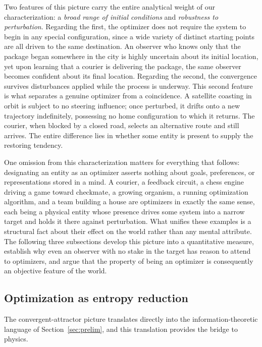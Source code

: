 \documentclass[11pt]{article}
\begin{document}
Two features of this picture carry the entire analytical weight of our characterization: a \emph{broad range of initial conditions} and \emph{robustness to perturbation}. Regarding the first, the optimizer does not require the system to begin in any special configuration, since a wide variety of distinct starting points are all driven to the same destination. An observer who knows only that the package began somewhere in the city is highly uncertain about its initial location, yet upon learning that a courier is delivering the package, the same observer becomes confident about its final location. Regarding the second, the convergence survives disturbances applied while the process is underway. This second feature is what separates a genuine optimizer from a coincidence. A satellite coasting in orbit is subject to no steering influence; once perturbed, it drifts onto a new trajectory indefinitely, possessing no home configuration to which it returns. The courier, when blocked by a closed road, selects an alternative route and still arrives. The entire difference lies in whether some entity is present to supply the restoring tendency.

One omission from this characterization matters for everything that follows: designating an entity as an optimizer asserts nothing about goals, preferences, or representations stored in a mind. A courier, a feedback circuit, a chess engine driving a game toward checkmate, a growing organism, a running optimization algorithm, and a team building a house are optimizers in exactly the same sense, each being a physical entity whose presence drives some system into a narrow target and holds it there against perturbation. What unifies these examples is a structural fact about their effect on the world rather than any mental attribute. The following three subsections develop this picture into a quantitative measure, establish why even an observer with no stake in the target has reason to attend to optimizers, and argue that the property of being an optimizer is consequently an objective feature of the world.

\subsection{Optimization as entropy reduction}
\label{sec:optentropy}

The convergent-attractor picture translates directly into the information-theoretic language of Section~\ref{sec:prelim}, and this translation provides the bridge to physics.
\end{document}

